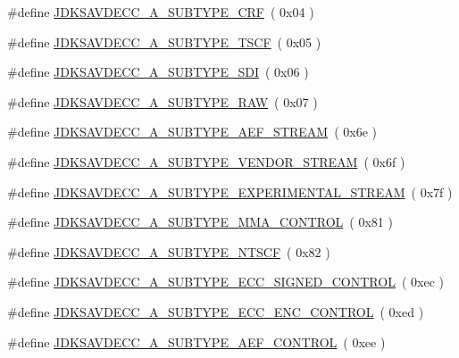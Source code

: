 \begin{DoxyCompactItemize}
\#define \hyperlink{group__subtype_ga9c3b6dcc9a0422251a2c6b78c502bbd0}{J\+D\+K\+S\+A\+V\+D\+E\+C\+C\+\_\+A\+\_\+\+S\+U\+B\+T\+Y\+P\+E\+\_\+\+C\+RF}~( 0x04 )
\item 
\#define \hyperlink{group__subtype_ga7662267df1b27971e48e002cc890d430}{J\+D\+K\+S\+A\+V\+D\+E\+C\+C\+\_\+A\+\_\+\+S\+U\+B\+T\+Y\+P\+E\+\_\+\+T\+S\+CF}~( 0x05 )
\item 
\#define \hyperlink{group__subtype_gadaad0a95993388744621ffcdb20c511b}{J\+D\+K\+S\+A\+V\+D\+E\+C\+C\+\_\+A\+\_\+\+S\+U\+B\+T\+Y\+P\+E\+\_\+\+S\+DI}~( 0x06 )
\item 
\#define \hyperlink{group__subtype_ga47d6c52cd17ca84087e7108d75ba029f}{J\+D\+K\+S\+A\+V\+D\+E\+C\+C\+\_\+A\+\_\+\+S\+U\+B\+T\+Y\+P\+E\+\_\+\+R\+AW}~( 0x07 )
\item 
\#define \hyperlink{group__subtype_ga615f752d59b26d5fc26e08766c7407df}{J\+D\+K\+S\+A\+V\+D\+E\+C\+C\+\_\+A\+\_\+\+S\+U\+B\+T\+Y\+P\+E\+\_\+\+A\+E\+F\+\_\+\+S\+T\+R\+E\+AM}~( 0x6e )
\item 
\#define \hyperlink{group__subtype_ga37f5fb1534ee5fe1c7a713265ec35afe}{J\+D\+K\+S\+A\+V\+D\+E\+C\+C\+\_\+A\+\_\+\+S\+U\+B\+T\+Y\+P\+E\+\_\+\+V\+E\+N\+D\+O\+R\+\_\+\+S\+T\+R\+E\+AM}~( 0x6f )
\item 
\#define \hyperlink{group__subtype_ga8ee4c1924d0b6478a19f028e19f1ad06}{J\+D\+K\+S\+A\+V\+D\+E\+C\+C\+\_\+A\+\_\+\+S\+U\+B\+T\+Y\+P\+E\+\_\+\+E\+X\+P\+E\+R\+I\+M\+E\+N\+T\+A\+L\+\_\+\+S\+T\+R\+E\+AM}~( 0x7f )
\item 
\#define \hyperlink{group__subtype_ga2945a8676c21619620f28a39d0bf6c0b}{J\+D\+K\+S\+A\+V\+D\+E\+C\+C\+\_\+A\+\_\+\+S\+U\+B\+T\+Y\+P\+E\+\_\+\+M\+M\+A\+\_\+\+C\+O\+N\+T\+R\+OL}~( 0x81 )
\item 
\#define \hyperlink{group__subtype_ga22a202e1902baa776168f001ab4fcb6d}{J\+D\+K\+S\+A\+V\+D\+E\+C\+C\+\_\+A\+\_\+\+S\+U\+B\+T\+Y\+P\+E\+\_\+\+N\+T\+S\+CF}~( 0x82 )
\item 
\#define \hyperlink{group__subtype_gac440a6002e9d5872c916f799a7ac062e}{J\+D\+K\+S\+A\+V\+D\+E\+C\+C\+\_\+A\+\_\+\+S\+U\+B\+T\+Y\+P\+E\+\_\+\+E\+C\+C\+\_\+\+S\+I\+G\+N\+E\+D\+\_\+\+C\+O\+N\+T\+R\+OL}~( 0xec )
\item 
\#define \hyperlink{group__subtype_ga1c75e49f9adbbff57b9851d6ebb06724}{J\+D\+K\+S\+A\+V\+D\+E\+C\+C\+\_\+A\+\_\+\+S\+U\+B\+T\+Y\+P\+E\+\_\+\+E\+C\+C\+\_\+\+E\+N\+C\+\_\+\+C\+O\+N\+T\+R\+OL}~( 0xed )
\item 
\#define \hyperlink{group__subtype_ga1e1fcd8f14b7d665ef1e6c2b1c10bdcf}{J\+D\+K\+S\+A\+V\+D\+E\+C\+C\+\_\+A\+\_\+\+S\+U\+B\+T\+Y\+P\+E\+\_\+\+A\+E\+F\+\_\+\+C\+O\+N\+T\+R\+OL}~( 0xee )

\end{DoxyCompactItemize}
